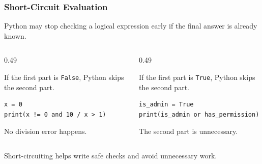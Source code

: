 \documentclass[aspectratio=169,10pt]{beamer}
\begin{document}
\begin{frame}[fragile]
\frametitle{Short-Circuit Evaluation}
\begin{tcolorbox}[lecturebox,title=Key idea]
Python may stop checking a logical expression early if the final answer is already known.
\end{tcolorbox}

\begin{columns}[T,totalwidth=\textwidth]
\begin{column}{0.49\textwidth}
\begin{tcolorbox}[lecturebox,title=With \texttt{and}]
\small
If the first part is \texttt{False}, Python skips the second part.
\begin{lstlisting}[style=pycodesmall]
x = 0
print(x != 0 and 10 / x > 1)
\end{lstlisting}
No division error happens.
\end{tcolorbox}
\end{column}
\begin{column}{0.49\textwidth}
\begin{tcolorbox}[lecturebox,title=With \texttt{or}]
\small
If the first part is \texttt{True}, Python skips the second part.
\begin{lstlisting}[style=pycodesmall]
is_admin = True
print(is_admin or has_permission)
\end{lstlisting}
The second part is unnecessary.
\end{tcolorbox}
\end{column}
\end{columns}

\begin{tcolorbox}[lecturebox,title=Why it matters]
\small Short-circuiting helps write safe checks and avoid unnecessary work.
\end{tcolorbox}
\end{frame}
\end{document}

